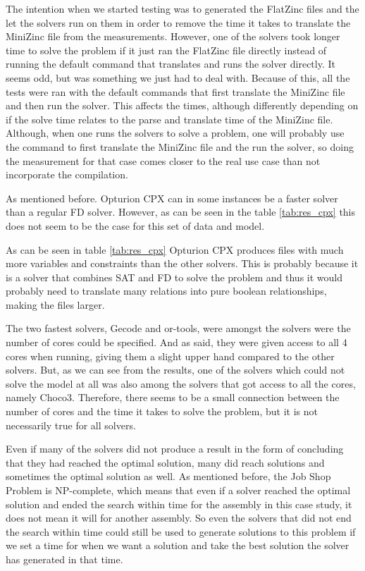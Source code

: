 The intention when we started testing was to generated the FlatZinc files and the let the solvers run on them in order to remove the time it takes to translate the MiniZinc file from the measurements. However, one of the solvers took longer time to solve the problem if it just ran the FlatZinc file directly instead of running the default command that translates and runs the solver directly. It seems odd, but was something we just had to deal with. Because of this, all the tests were ran with the default commands that first translate the MiniZinc file and then run the solver. This affects the times, although differently depending on if the solve time relates to the parse and translate time of the MiniZinc file. Although, when one runs the solvers to solve a problem, one will probably use the command to first translate the MiniZinc file and the run the solver, so doing the measurement for that case comes closer to the real use case than not incorporate the compilation.

As mentioned before. Opturion CPX can in some instances be a faster solver than a regular FD solver. However, as can be seen in the table \ref{tab:res_cpx} this does not seem to be the case for this set of data and model.

As can be seen in table \ref{tab:res_cpx} Opturion CPX produces files with much more variables and constraints than the other solvers. This is probably because it is a solver that combines SAT and FD to solve the problem and thus it would probably need to translate many relations into pure boolean relationships, making the files larger.

The two fastest solvers, Gecode and or-tools, were amongst the solvers were the number of cores could be specified. And as said, they were given access to all 4 cores when running, giving them a slight upper hand compared to the other solvers. But, as we can see from the results, one of the solvers which could not solve the model at all was also among the solvers that got access to all the cores, namely Choco3. Therefore, there seems to be a small connection between the number of cores and the time it takes to solve the problem, but it is not necessarily true for all solvers.

Even if many of the solvers did not produce a result in the form of concluding that they had reached the optimal solution, many did reach solutions and sometimes the optimal solution as well. As mentioned before, the Job Shop Problem is NP-complete, which means that even if a solver reached the optimal solution and ended the search within time for the assembly in this case study, it does not mean it will for another assembly. So even the solvers that did not end the search within time could still be used to generate solutions to this problem if we set a time for when we want a solution and take the best solution the solver has generated in that time.

